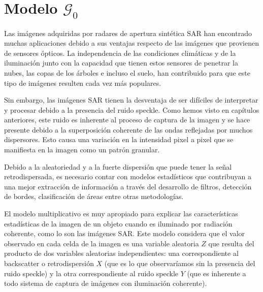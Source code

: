 
\chapter{Modelo $\mathcal{G}_0$}
\label{modeloG0}

Las imágenes adquiridas por radares de apertura sintética SAR han encontrado muchas aplicaciones debido a sus ventajas respecto de las imágenes que provienen de sensores ópticos. La independencia de las condiciones climáticas y de la iluminación junto con la capacidad que tienen estos sensores de penetrar la nubes, las copas de los árboles e incluso el suelo, han contribuido para que este tipo de imágenes resulten cada vez más populares.

Sin embargo, las imágenes SAR tienen la desventaja de ser difíciles de interpretar y procesar debido a la presencia del ruido speckle. Como hemos visto en capítulos anteriores, este ruido es inherente al proceso de captura de la imagen y se hace presente debido a la superposición coherente de las ondas reflejadas por muchos dispersores. Esto causa una variación en la intensidad pixel a pixel que se manifiesta en la imagen como un patrón granular. 

Debido a la aleatoriedad y a la fuerte dispersión que puede tener la señal retrodispersada, es necesario contar con modelos estadísticos que contribuyan a una mejor extracción de información a través del desarrollo de filtros, detección de bordes, clasificación de áreas entre otras metodologías. 

El modelo multiplicativo es muy apropiado para explicar las características estadísticas de la imagen de un objeto cuando es iluminado por radiación coherente, como lo son las imágenes SAR.
Este modelo considera que el valor observado en cada celda de la imagen es una variable aleatoria $Z$ que resulta del producto de dos variables aleatorias independientes: una correspondiente al backscatter o retrodispersión $X$ (que es lo que observaríamos sin la presencia del ruido speckle) y la otra correspondiente al ruido speckle $Y$ (que es inherente a todo sistema de captura de imágenes con iluminación coherente).

